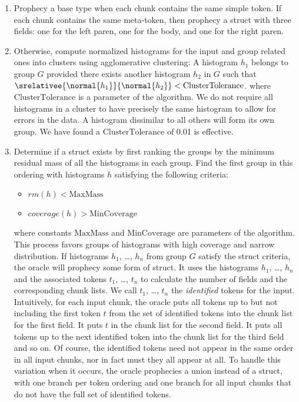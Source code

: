 \begin {enumerate}
\item Prophecy a base type when each chunk contains the same simple
  token. If each chunk contains the same meta-token, then prophecy a struct
  with three fields: one for the left paren, one for the body, and one
  for the right paren.

\item Otherwise, compute normalized histograms for the input and group
  related ones into clusters using agglomerative clustering:  A
  histogram $h_1$ belongs to group $G$ provided there exists another
  histogram $h_2$ in $G$ such  that
  $\srelativee{\normal{h_1}}{\normal{h_2}} <  \mathrm{ClusterTolerance}$.  
  where $\mathrm{ClusterTolerance}$ is a parameter of the algorithm. We do not
  require all histograms in a cluster to 
  have precisely the same histogram to allow for errors in the data.
  A histogram dissimilar to all others will form its own group.
  We have found a $\mathrm{ClusterTolerance}$ of 0.01 is effective.  

\item Determine if a struct exists by first ranking the groups by the
  minimum residual mass of all the histograms in each group. Find the first group in this
  ordering with histograms $h$ satisfying the following criteria:
\begin {itemize}
\item $\mathit{rm}(h) < \mathrm{MaxMass}$
\item $\mathit{coverage}(h) > \mathrm{MinCoverage}$
\end{itemize}
where constants $\mathrm{MaxMass}$ and $\mathrm{MinCoverage}$ are
parameters of the algorithm.  
This process favors groups of histograms with high
coverage and narrow distribution.  
If histograms $h_1$, \ldots, $h_n$ from
group $G$ satisfy the struct criteria, the oracle will prophecy some
form of struct. It uses the histograms $h_1$, \ldots, $h_n$ and the associated
tokens $t_1$, \ldots, $t_n$ to calculate the number of fields and the
corresponding chunk lists.  We call $t_1$, \ldots, $t_n$ the {\em
  identified} tokens for the input.
Intuitively, for each input chunk, the oracle puts
all tokens up to but not including the first token $t$ from the set of
identified tokens into the chunk list for the first field.  It puts $t$ in
the chunk list for the second field. It puts all tokens up to the next
identified token into the chunk list for the third field and so on. Of
course, the identified tokens need not appear in the same order in all
input chunks, nor in fact must they all appear at all.  To handle
this variation when it occurs, the oracle prophecies a union instead
of a struct, with one branch per token ordering and one branch for all
input chunks that do not have the full set of identified tokens.



\end{enumerate}
